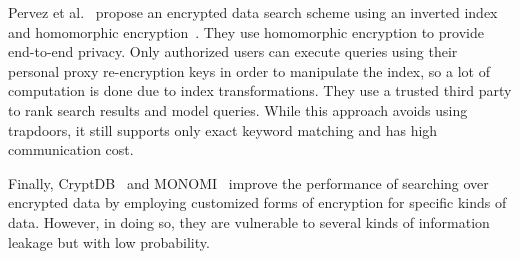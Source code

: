 Pervez et al.~\cite{zeehan} propose an encrypted data search scheme using an inverted index and homomorphic encryption~\cite{craig}.
They use homomorphic encryption to provide end-to-end privacy. Only
authorized users can execute queries using their personal proxy re-encryption keys in
order to manipulate the index, so a lot of computation is done due to index
transformations. They use a trusted third party to rank search results and model queries.
While this approach avoids using trapdoors, it still supports only
exact keyword matching and has high communication cost.

Finally, CryptDB~\cite{popa2011cryptdb} and MONOMI~\cite{tu2013processing} improve the performance of searching over encrypted data 
by employing customized forms of encryption for specific kinds of data.
However, in doing so, they are vulnerable to several kinds of information 
leakage but with low probability.
